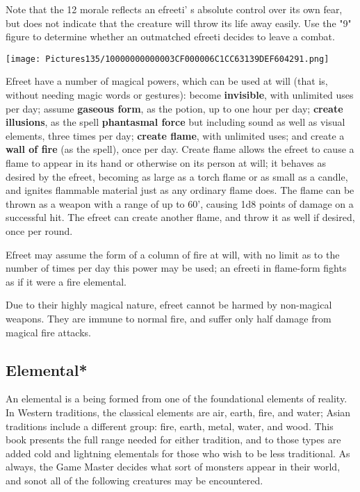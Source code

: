 \documentclass[a4paper,twoside,openany,10pt]{book}
\begin{document}
\begin{multicols}{2}
Note that the 12 morale reflects an efreeti' s absolute control over its own fear, but does not indicate that the creature will throw its life away easily. Use the "9" figure to determine whether an outmatched efreeti decides to leave a combat.


\begin{center}
	\texttt{[image: Pictures135/10000000000003CF000006C1CC63139DEF604291.png]}
\end{center}

Efreet have a number of magical powers, which can be used at will (that is, without needing magic words or gestures): become \textbf{invisible}, with unlimited uses per day; assume \textbf{gaseous form}, as the potion, up to one hour per day; \textbf{create illusions}, as the spell \textbf{phantasmal force} but including sound as well as visual elements, three times per day; \textbf{create flame}, with unlimited uses; and create a \textbf{wall of fire }(as the spell), once per day. Create flame allows the efreet to cause a flame to appear in its hand or otherwise on its person at will; it behaves as desired by the efreet, becoming as large as a torch flame or as small as a candle, and ignites flammable material just as any ordinary flame does. The flame can be thrown as a weapon with a range of up to 60', causing 1d8 points of damage on a successful hit. The efreet can create another flame, and throw it as well if desired, once per round.

Efreet may assume the form of a column of fire at will, with no limit as to the number of times per day this power may be used; an efreeti in flame-form fights as if it were a fire elemental.

Due to their highly magical nature, efreet cannot be harmed by non-magical weapons. They are immune to normal fire, and suffer only half damage from magical fire attacks.


\subsection*{Elemental*}\label{elemental}

An elemental is a being formed from one of the foundational elements of reality. In Western traditions, the classical elements are air, earth, fire, and water; Asian traditions include a different group: fire, earth, metal, water, and wood. This book presents the full range needed for either tradition, and to those types are added cold and lightning elementals for those who wish to be less traditional. As always, the Game Master decides what sort of monsters appear in their world, and sonot all of the following creatures may be encountered.


\end{multicols}
\end{document}
